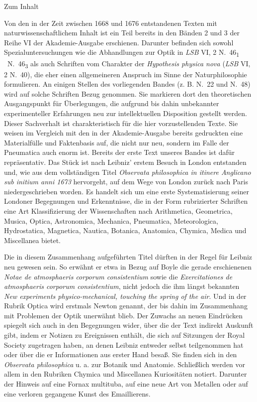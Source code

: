 Zum Inhalt\par\vspace{1.0ex}

Von den in der Zeit zwischen 1668 und 1676 entstandenen Texten mit natur\-wissenschaftlichem Inhalt ist ein Teil bereits in den B\"{a}nden 2 und 3 der Reihe VI der Akademie-Ausgabe erschienen. Darunter befinden sich sowohl Spezialuntersuchungen wie die Abhandlungen zur Optik in \textit{LSB} VI, 2 N.~46\textsubscript{1} \textendash\ N.~46\textsubscript{3} als auch Schriften vom Charakter der \cite{00256}\textit{Hypothesis physica nova} (\textit{LSB} VI, 2 N.~40), die eher einen allgemeineren Anspruch im Sinne der Naturphilosophie formulieren. An einigen Stellen des vorliegenden Bandes (z. B. N.~22 und N.~48) wird auf solche Schriften Bezug genommen. Sie markieren dort den theoretischen Ausgangspunkt f\"{u}r \"{U}berlegungen, die aufgrund bis dahin unbekannter experimenteller Erfahrungen neu zur intellektuellen Disposition gestellt werden.
Dieser Sachverhalt ist charakteristisch f\"{u}r die hier vorzustellenden Texte. Sie weisen im Vergleich mit den in der Akademie-Ausgabe bereits gedruckten eine Materialf\"{u}lle und Faktenbasis auf, die nicht nur neu, sondern im Falle der Pneumatica auch enorm ist. Bereits der erste Text unseres Bandes ist daf\"{u}r repr\"{a}sentativ.
Das St\"{u}ck ist nach Leibniz' erstem Besuch in London entstanden und, wie aus dem vollst\"{a}ndigen Titel \textit{Observata philosophica in itinere Anglicano sub initium anni 1673} hervorgeht, auf dem Wege von London zur\"{u}ck nach Paris niedergeschrieben worden. Es handelt sich um eine erste Systematisierung seiner Londoner Begegnungen und Erkenntnisse, die in der Form rubrizierter Schriften eine Art Klassifizierung der Wissenschaften nach Arithmetica, Geometrica, Musica, Optica, Astronomica, Mechanica, Pneumatica, Meteorologica, Hydrostatica, Magnetica, Nautica, Botanica, Anatomica, Chymica, Medica und Miscellanea bietet.\par
Die in diesem Zusammenhang aufgef\"{u}hrten Titel d\"{u}rften in der Regel f\"{u}r Leibniz neu gewesen sein. So erw\"{a}hnt er etwa in Bezug auf Boyle die gerade erschienenen \textit{Notae de atmosphaeris corporum consistentium} sowie die \textit{Exercitationes de atmosphaeris corporum consistentium}, nicht jedoch die ihm l\"{a}ngst bekannten \textit{New experiments physico-mechanical, touching the spring of the air}. Und in der Rubrik Optica wird erstmals Newton genannt, der bis dahin im Zusammenhang mit Problemen der Optik unerw\"{a}hnt blieb. 
Der Zuwachs an neuen Eindr\"{u}cken spiegelt sich auch in den Begegnungen wider, \"{u}ber die der Text indi\-rekt Auskunft gibt, indem er Notizen zu Ereignissen enth\"{a}lt, die sich auf Sitzungen der Royal Society zugetragen haben, an denen Leibniz entweder selbst teilgenommen hat oder \"{u}ber die er Informationen aus erster Hand besa{\ss}. Sie finden sich in den \textit{Observata philosophica} u. a. zur Botanik und Anatomie. Schlie{\ss}lich werden vor allem in den Rubriken Chymica und Miscellanea Kuriosit\"{a}ten notiert. Darunter der Hinweis auf eine Fornax multituba, auf eine neue Art von Metallen oder auf eine verloren gegangene Kunst des Emaillierens.\par
